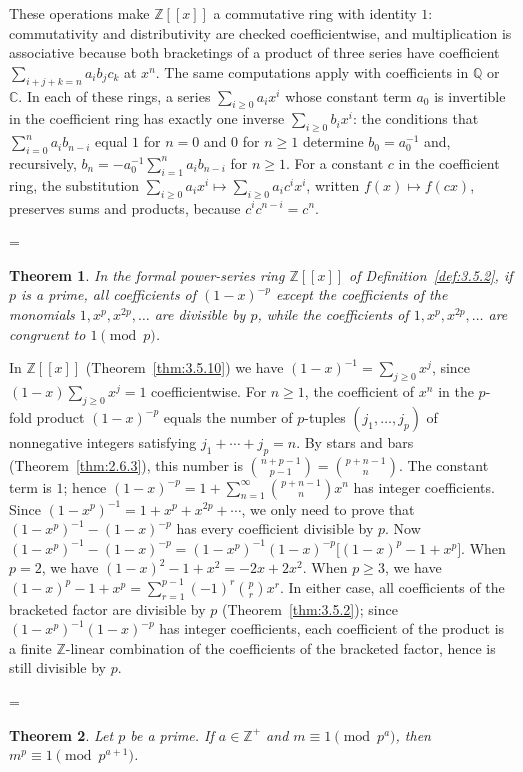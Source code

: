 \documentclass[11pt]{article}
\makeatletter
\theoremstyle{ntstyle}
\newtheorem{theorem}{Theorem}[subsection]
\let\nt@closedisplay\]
\def\nt@guardedclose{\@ifnextchar\par{\nt@closeafterpar}{\@ifnextchar\end{\postdisplaypenalty\@M\nt@closedisplay}{\nt@closedisplay}}}
\def\nt@closeafterpar\par{\@ifnextchar\par{\nt@closeafterpar}{\@ifnextchar\end{\postdisplaypenalty\@M\nt@closedisplay\par}{\nt@closedisplay\par}}}
\renewenvironment{proof}[1][\proofname]{\par
  \pushQED{\qed}\normalfont\topsep\medskipamount\edef\nt@afterproof{\@endparpenalty=\the\@endparpenalty\relax}\@beginparpenalty\@M\@endparpenalty\@M\let\]\nt@guardedclose\trivlist\item[]\textit{#1\@addpunct{.}} \ignorespaces}{\ifvmode\addpenalty\@M\fi\popQED\nt@afterproof\endtrivlist\@endpefalse}
\makeatother
\begin{document}
\begin{proof} These operations make $\mathbb{Z}[[x]]$ a commutative ring with identity
	$1$: commutativity and distributivity are checked coefficientwise, and
	multiplication is associative because both bracketings of a product of
	three series have coefficient $\sum_{i+j+k=n}a_ib_jc_k$ at $x^n$.
	The same computations apply with coefficients in $\mathbb{Q}$ or $\mathbb{C}$.
	In each of these rings, a series
	$\sum_{i\ge0}a_ix^i$ whose constant term $a_0$ is invertible in the
	coefficient ring has exactly one inverse $\sum_{i\ge0}b_ix^i$: the
	conditions that $\sum_{i=0}^{n}a_ib_{n-i}$ equal $1$ for $n=0$ and $0$ for
	$n\ge1$ determine $b_0=a_0^{-1}$ and, recursively,
	$b_n=-a_0^{-1}\sum_{i=1}^{n}a_ib_{n-i}$ for $n\ge1$. For a constant $c$ in the
	coefficient ring, the substitution $\sum_{i\ge0}a_ix^i\mapsto\sum_{i\ge0}a_ic^ix^i$,
	written $f(x)\mapsto f(cx)$, preserves sums and products, because
	$c^ic^{n-i}=c^n$.

\end{proof}
\begin{theorem}\label{thm:3.5.11} In the formal power-series ring
	$\mathbb{Z}[[x]]$ of Definition~\ref{def:3.5.2}, if $p$ is a prime, all coefficients of $(1-x)^{-p}$ except the coefficients of the monomials $1, x^{p}, x^{2p}, \ldots$ are divisible by $p$, while the coefficients of $1, x^{p}, x^{2p},
		\ldots$ are congruent to $1 \pmod{p}$.

\end{theorem}

\begin{proof} In $\mathbb{Z}[[x]]$ (Theorem~\ref{thm:3.5.10}) we have
	$(1-x)^{-1} = \sum_{j\ge0} x^{j}$, since
	$(1-x)\sum_{j\ge0}x^{j} = 1$ coefficientwise. For $n\ge1$, the coefficient of $x^{n}$ in the $p$-fold product
	$(1-x)^{-p}$ equals the number of
	$p$-tuples $(j_1,\ldots,j_p)$ of nonnegative integers satisfying
	$j_1+\cdots+j_p=n$. By stars and bars (Theorem~\ref{thm:2.6.3}), this
	number is $\binom{n+p-1}{p-1} = \binom{p+n-1}{n}$. The constant term is $1$; hence
	$(1-x)^{-p} = 1 + \sum_{n=1}^{\infty}
		\binom{p+n-1}{n} x^{n}$ has integer coefficients. Since
	$(1-x^{p})^{-1} = 1 + x^{p} + x^{2p} + \cdots$, we only need to prove that
	$(1-x^{p})^{-1} - (1-x)^{-p}$ has every coefficient divisible by $p$.
	Now $(1-x^{p})^{-1} - (1-x)^{-p} =
		(1-x^{p})^{-1}(1-x)^{-p}\big[(1-x)^{p} - 1 + x^{p}\big]$. When $p =
		2$, we have $(1-x)^{2} - 1 + x^{2} = -2x + 2x^{2}$. When $p \ge 3$,
	we have $(1-x)^{p} - 1 + x^{p} = \sum_{r=1}^{p-1} (-1)^{r} \binom{p}{r}
		x^{r}$. In either case, all coefficients of the bracketed factor are divisible by $p$
	(Theorem~\ref{thm:3.5.2}); since $(1-x^{p})^{-1}(1-x)^{-p}$ has integer coefficients, each
	coefficient of the product is a finite $\mathbb{Z}$-linear combination of the coefficients of the bracketed factor,
	hence is still divisible by $p$.

\end{proof}
\begin{theorem}\label{thm:3.5.12} Let $p$
	be a prime. If $a \in \mathbb{Z}^+$ and $m \equiv 1 \pmod{p^{a}}$, then $m^{p}
		\equiv 1 \pmod{p^{a+1}}$.

\end{theorem}
\end{document}
